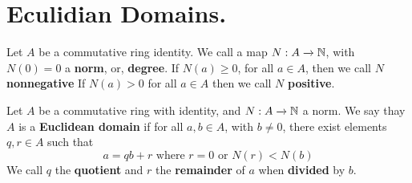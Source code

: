 \section{Eculidian Domains.}

\begin{definition}
    Let $A$ be a commutative ring identity. We call a map  $N:A \xrightarrow{} \mathbb{N}$,
    with $N(0)=0$ a \textbf{norm}, or, \textbf{degree}. If $N(a) \geq 0$, for all
    $a \in A$, then we call $N$ \textbf{nonnegative} If $N(a)>0$ for all $a \in A$
    then we call  $N$ \textbf{positive}.
\end{definition}

\begin{definition}
    Let $A$ be a commutative ring with identity, and  $N:A \xrightarrow{} \mathbb{N}$ a
    norm. We say thay $A$ is a \textbf{Euclidean domain} if for all $a,b \in A$,
    with $b \neq 0$, there exist elements  $q,r \in A$ such that
    \begin{equation*}
        a=qb+r \text{ where } r=0 \text{ or } N(r)<N(b)
    \end{equation*}
    We call $q$ the  \textbf{quotient} and $r$ the  \textbf{remainder} of $a$
    when  \textbf{divided} by $b$.
\end{definition}

